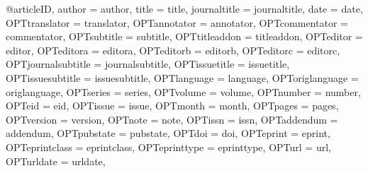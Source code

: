 \documentclass[landscape,a0paper,fontscale=0.285]{baposter} %
\begin{document}
\begin{poster}
{}

@article{ID,
author = {author},
title = {title},
journaltitle = {journaltitle},
date = {date},
OPTtranslator = {translator},
OPTannotator = {annotator},
OPTcommentator = {commentator},
OPTsubtitle = {subtitle},
OPTtitleaddon = {titleaddon},
OPTeditor = {editor},
OPTeditora = {editora},
OPTeditorb = {editorb},
OPTeditorc = {editorc},
OPTjournalsubtitle = {journalsubtitle},
OPTissuetitle = {issuetitle},
OPTissuesubtitle = {issuesubtitle},
OPTlanguage = {language},
OPToriglanguage = {origlanguage},
OPTseries = {series},
OPTvolume = {volume},
OPTnumber = {number},
OPTeid = {eid},
OPTissue = {issue},
OPTmonth = {month},
OPTpages = {pages},
OPTversion = {version},
OPTnote = {note},
OPTissn = {issn},
OPTaddendum = {addendum},
OPTpubstate = {pubstate},
OPTdoi = {doi},
OPTeprint = {eprint},
OPTeprintclass = {eprintclass},
OPTeprinttype = {eprinttype},
OPTurl = {url},
OPTurldate = {urldate},
}

\end{poster}
\end{document}
